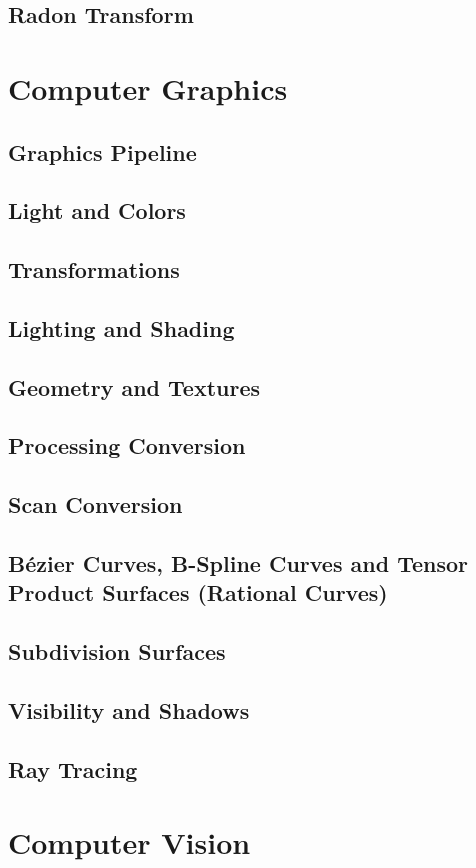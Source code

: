 \documentclass[a4paper,10pt]{article}
\begin{document}
\subsection{Radon Transform}
\section{Computer Graphics}
\subsection{Graphics Pipeline}
\subsection{Light and Colors}
\subsection{Transformations}
\subsection{Lighting and Shading}
\subsection{Geometry and Textures}
\subsection{Processing Conversion}
\subsection{Scan Conversion}
\subsection{Bézier Curves, B-Spline Curves and Tensor Product Surfaces (Rational Curves)}
\subsection{Subdivision Surfaces}
\subsection{Visibility and Shadows}
\subsection{Ray Tracing}

\pagebreak
\section{Computer Vision}
\end{document}
